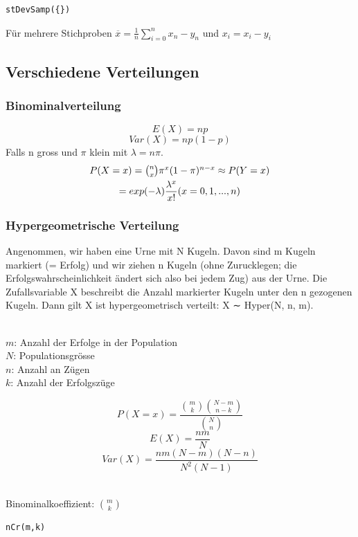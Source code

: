 \documentclass{article}
\begin{document}
\begin{multicols*}{3}
      \begin{Verbatim}[frame=single]
stDevSamp({})
      \end{Verbatim}

      Für mehrere Stichproben $\overline{x}=\frac{1}{n}\sum_{i=0}^n{x_n-y_n}$ und $x_i = x_i - y_i$

    \subsection{Verschiedene Verteilungen}

      \subsubsection{Binominalverteilung}
      $$E(X)=np$$
      $$Var(X)=np(1-p)$$
      Falls n gross und $\pi$ klein mit $\lambda = n\pi$.
      \begin{multline}
        $$P(X=x) = \binom{n}{x}\pi^x(1-\pi)^{n-x}\approx P(Y = x) \\ = exp(-\lambda)\frac{\lambda^x}{x!}(x = 0,1,...,n)$$
      \end{multline}

      \subsubsection{Hypergeometrische Verteilung}
      Angenommen, wir haben eine Urne mit N Kugeln. Davon sind m Kugeln markiert
      (= Erfolg) und wir ziehen n Kugeln (ohne Zurucklegen; die Erfolgswahrscheinlichkeit ändert sich also bei jedem Zug) aus der Urne. Die Zufallsvariable
      X beschreibt die Anzahl markierter Kugeln unter den n gezogenen Kugeln.
      Dann gilt X ist hypergeometrisch verteilt: X ∼ Hyper(N, n, m).

      \\$m$: Anzahl der Erfolge in der Population
      \\$N$: Populationsgrösse
      \\$n$: Anzahl an Zügen
      \\$k$: Anzahl der Erfolgszüge

      $$P(X=x)={\frac  {\displaystyle {m \choose k}{N-m \choose n-k}}{\displaystyle {N \choose n}}}$$
      $$E(X)=\frac{nm}{N}$$
      $$Var(X)= \frac{nm(N-m)(N-n)}{N^2(N-1)}$$

      \\Binominalkoeffizient: ${m \choose k}$
      \begin{Verbatim}[frame=single]
nCr(m,k)
      \end{Verbatim}


\end{multicols*}
\end{document}

